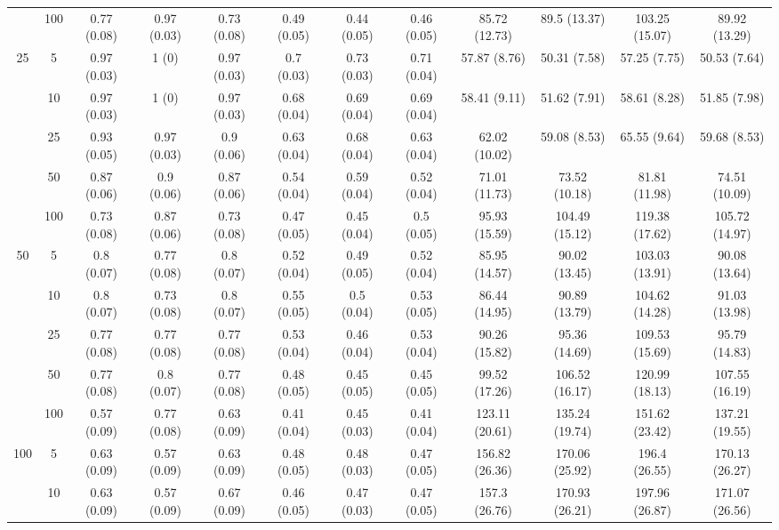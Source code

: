 \documentclass[11pt]{article}
\theoremstyle{definition}
\begin{document}
\begin{landscape}
\begin{table}[b]
\begin{center}
{\begin{tabular}{cc|ccc|ccc|cccc|}
  & 100  & 0.77 (0.08) & 0.97 (0.03) & 0.73 (0.08) & 0.49 (0.05) & 0.44 (0.05) & 0.46 (0.05) & 85.72 (12.73) & 89.5 (13.37) & 103.25 (15.07) & 89.92 (13.29)\\[.3cm] 
 \multirow{5}{*}{25} & 5  & 0.97 (0.03) & 1 (0) & 0.97 (0.03) & 0.7 (0.03) & 0.73 (0.03) & 0.71 (0.04) & 57.87 (8.76) & 50.31 (7.58) & 57.25 (7.75) & 50.53 (7.64) \\ 
  & 10  & 0.97 (0.03) & 1 (0) & 0.97 (0.03) & 0.68 (0.04) & 0.69 (0.04) & 0.69 (0.04) & 58.41 (9.11) & 51.62 (7.91) & 58.61 (8.28) & 51.85 (7.98) \\ 
  & 25  & 0.93 (0.05) & 0.97 (0.03) & 0.9 (0.06) & 0.63 (0.04) & 0.68 (0.04) & 0.63 (0.04) & 62.02 (10.02) & 59.08 (8.53) & 65.55 (9.64) & 59.68 (8.53) \\ 
  & 50  & 0.87 (0.06) & 0.9 (0.06) & 0.87 (0.06) & 0.54 (0.04) & 0.59 (0.04) & 0.52 (0.04) & 71.01 (11.73) & 73.52 (10.18) & 81.81 (11.98) & 74.51 (10.09) \\ 
  & 100  & 0.73 (0.08) & 0.87 (0.06) & 0.73 (0.08) & 0.47 (0.05) & 0.45 (0.04) & 0.5 (0.05) & 95.93 (15.59) & 104.49 (15.12) & 119.38 (17.62) & 105.72 (14.97) \\[.3cm] 
 \multirow{5}{*}{50} & 5  & 0.8 (0.07) & 0.77 (0.08) & 0.8 (0.07) & 0.52 (0.04) & 0.49 (0.05) & 0.52 (0.04) & 85.95 (14.57) & 90.02 (13.45) & 103.03 (13.91) & 90.08 (13.64) \\ 
  & 10  & 0.8 (0.07) & 0.73 (0.08) & 0.8 (0.07) & 0.55 (0.05) & 0.5 (0.04) & 0.53 (0.05) & 86.44 (14.95) & 90.89 (13.79) & 104.62 (14.28) & 91.03 (13.98) \\ 
  & 25  & 0.77 (0.08) & 0.77 (0.08) & 0.77 (0.08) & 0.53 (0.04) & 0.46 (0.04) & 0.53 (0.04) & 90.26 (15.82) & 95.36 (14.69) & 109.53 (15.69) & 95.79 (14.83) \\ 
  & 50  & 0.77 (0.08) & 0.8 (0.07) & 0.77 (0.08) & 0.48 (0.05) & 0.45 (0.05) & 0.45 (0.05) & 99.52 (17.26) & 106.52 (16.17) & 120.99 (18.13) & 107.55 (16.19) \\ 
  & 100  & 0.57 (0.09) & 0.77 (0.08) & 0.63 (0.09) & 0.41 (0.04) & 0.45 (0.03) & 0.41 (0.04) & 123.11 (20.61) & 135.24 (19.74) & 151.62 (23.42) & 137.21 (19.55) \\[.3cm] 
 \multirow{5}{*}{100} & 5  & 0.63 (0.09) & 0.57 (0.09) & 0.63 (0.09) & 0.48 (0.05) & 0.48 (0.03) & 0.47 (0.05) & 156.82 (26.36) & 170.06 (25.92) & 196.4 (26.55) & 170.13 (26.27) \\ 
  & 10  & 0.63 (0.09) & 0.57 (0.09) & 0.67 (0.09) & 0.46 (0.05) & 0.47 (0.03) & 0.47 (0.05) & 157.3 (26.76) & 170.93 (26.21) & 197.96 (26.87) & 171.07 (26.56) \\ 

\end{tabular}}
\end{center}
\end{table}
\end{landscape}
\end{document}
